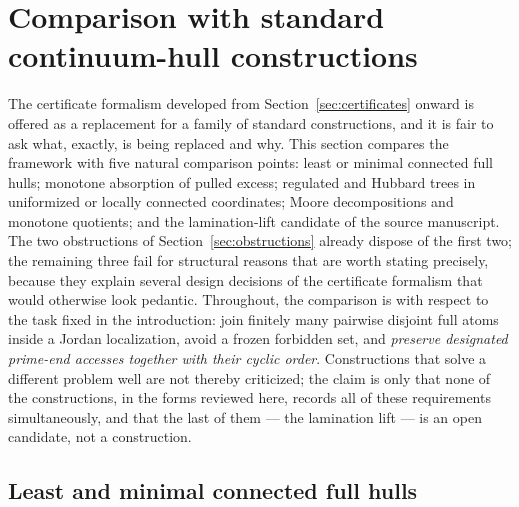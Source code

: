 
\section{Comparison with standard continuum-hull constructions}
\label{sec:comparison}

The certificate formalism developed from Section~\ref{sec:certificates}
onward is offered as a replacement for a family of standard constructions,
and it is fair to ask what, exactly, is being replaced and why.  This
section compares the framework with five natural comparison points:
least or minimal connected full hulls; monotone
absorption of pulled excess; regulated and Hubbard trees in uniformized or
locally connected coordinates; Moore decompositions and monotone
quotients; and the lamination-lift candidate of the source manuscript.
The two obstructions of Section~\ref{sec:obstructions} already dispose of
the first two; the remaining three fail for structural reasons that are
worth stating precisely, because they explain several design decisions of
the certificate formalism that would otherwise look pedantic.  Throughout,
the comparison is with respect to the task fixed in the introduction:
join finitely many pairwise disjoint full atoms inside a Jordan
localization, avoid a frozen forbidden set, and \emph{preserve designated
prime-end accesses together with their cyclic order}.  Constructions that
solve a different problem well are not thereby criticized; the claim is
only that none of the constructions, in the forms reviewed here, records
all of these requirements simultaneously, and that the last of them ---
the lamination lift --- is an open candidate, not a construction.

\subsection{Least and minimal connected full hulls}
\label{subsec:A-comp-least}

